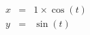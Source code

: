 \documentclass{article}
\begin{document}
\begin{eqnarray*}
x&=&1\times \cos\left( t \right)\\
y&=&\sin\left( t \right)\\
\end{eqnarray*}
\end{document}
